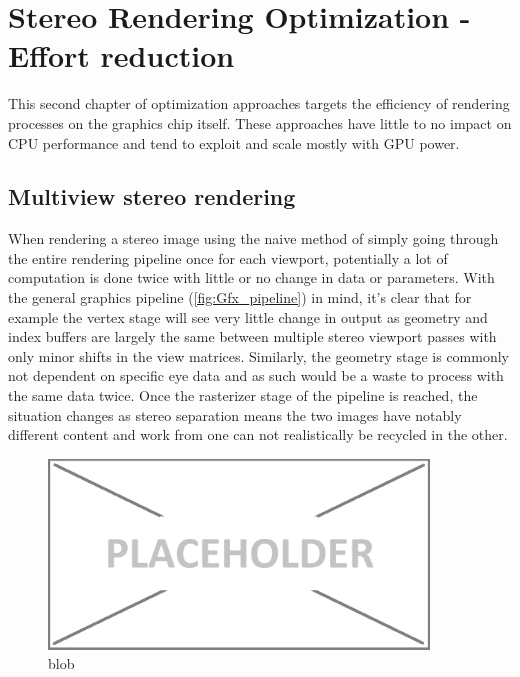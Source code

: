 
\chapter{Stereo Rendering Optimization - Effort reduction}
This second chapter of optimization approaches targets the efficiency of rendering processes on the graphics chip itself. These approaches have little to no impact on CPU performance and tend to exploit and scale mostly with GPU power. 

\section{Multiview stereo rendering}
When rendering a stereo image using the naive method of simply going through the entire rendering pipeline once for each viewport, potentially a lot of computation is done twice with little or no change in data or parameters. 
With the general graphics pipeline (\autoref{fig:Gfx_pipeline}) in mind, it's clear that for example the vertex stage will see very little change in output as geometry and index buffers are largely the same between multiple stereo viewport passes with only minor shifts in the view matrices. Similarly, the geometry stage is commonly not dependent on specific eye data and as such would be a waste to process with the same data twice. Once the rasterizer stage of the pipeline is reached, the situation changes as stereo separation means the two images have notably different content and work from one can not realistically be recycled in the other. 

\begin{figure}[htb]
  \centering
  \includegraphics[width=0.9\textwidth]{pictures/placeholder}
  \caption{blob} \label{fig:Gfx_pipeline}
\end{figure}


